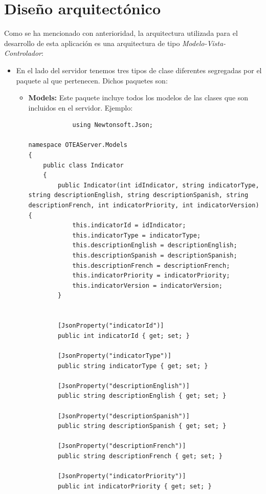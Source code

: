 \section{Diseño arquitectónico}
Como se ha mencionado con anterioridad, la arquitectura utilizada para el desarrollo de esta aplicación es una arquitectura de tipo \textit{Modelo-Vista-Controlador}:
\begin{itemize}
    \item En el lado del servidor tenemos tres tipos de clase diferentes segregadas por el paquete al que pertenecen. Dichos paquetes son:
    \begin{itemize}
        \item \textbf{Models: }Este paquete incluye todos los modelos de las clases que son incluidos en el servidor. Ejemplo: \begin{lstlisting}
            using Newtonsoft.Json;

namespace OTEAServer.Models
{
    public class Indicator
    {
        public Indicator(int idIndicator, string indicatorType, string descriptionEnglish, string descriptionSpanish, string descriptionFrench, int indicatorPriority, int indicatorVersion) {
            this.indicatorId = idIndicator;
            this.indicatorType = indicatorType;
            this.descriptionEnglish = descriptionEnglish;
            this.descriptionSpanish = descriptionSpanish;
            this.descriptionFrench = descriptionFrench;
            this.indicatorPriority = indicatorPriority;
            this.indicatorVersion = indicatorVersion;
        }


        [JsonProperty("indicatorId")]
        public int indicatorId { get; set; }

        [JsonProperty("indicatorType")]
        public string indicatorType { get; set; }

        [JsonProperty("descriptionEnglish")]
        public string descriptionEnglish { get; set; }
        
        [JsonProperty("descriptionSpanish")]
        public string descriptionSpanish { get; set; }
        
        [JsonProperty("descriptionFrench")]
        public string descriptionFrench { get; set; }

        [JsonProperty("indicatorPriority")]
        public int indicatorPriority { get; set; }


\end{lstlisting}
\end{itemize}
\end{itemize}
